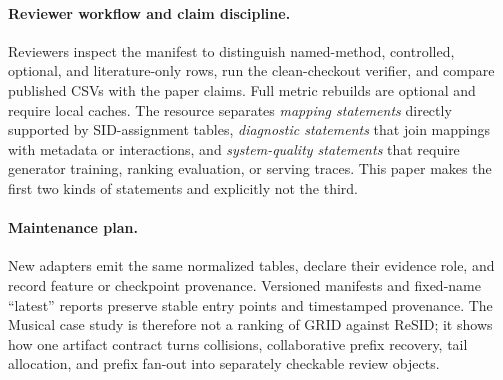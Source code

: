 \paragraph{Reviewer workflow and claim discipline.}
Reviewers inspect the manifest to distinguish named-method, controlled,
optional, and literature-only rows, run the clean-checkout verifier, and compare
published CSVs with the paper claims. Full metric rebuilds are optional and
require local caches. The resource separates \emph{mapping statements} directly
supported by SID-assignment tables, \emph{diagnostic statements} that join
mappings with metadata or interactions, and \emph{system-quality statements}
that require generator training, ranking evaluation, or serving traces. This
paper makes the first two kinds of statements and explicitly not the third.

\paragraph{Maintenance plan.}
New adapters emit the same normalized tables, declare their evidence role, and
record feature or checkpoint provenance. Versioned manifests and fixed-name
``latest'' reports preserve stable entry points and timestamped provenance. The
Musical case study is therefore not a ranking of GRID against ReSID; it shows
how one artifact contract turns collisions, collaborative prefix recovery, tail
allocation, and prefix fan-out into separately checkable review objects.
